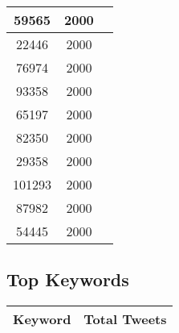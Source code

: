 \documentclass{article}\usepackage[T1]{fontenc}
\begin{document}
\begin{tabular}{|c|c|c|}
 \hline
59565 & 2000\\ 
 \hline
22446 & 2000\\ 
 \hline
76974 & 2000\\ 
 \hline
93358 & 2000\\ 
 \hline
65197 & 2000\\ 
 \hline
82350 & 2000\\ 
 \hline
29358 & 2000\\ 
 \hline
101293 & 2000\\ 
 \hline
87982 & 2000\\ 
 \hline
54445 & 2000\\ 
 \hline
\end{tabular}\subsection*{Top Keywords}\begin{tabular}{|c|c|}         \hline         Keyword & Total Tweets \\ 
 \hline
\end{tabular}
\end{document}
